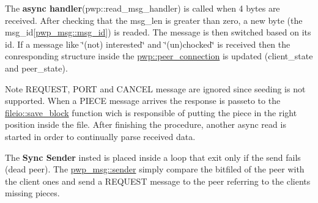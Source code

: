 The {\bfseries async handler}(pwp\+::read\+\_\+msg\+\_\+handler) is called when 4 bytes are received. After checking that the msg\+\_\+len is greater than zero, a new byte (the msg\+\_\+id\mbox{[}\hyperlink{namespacepwp__msg_a0b9a29508f00a30e5138d2b78f4b1daf}{pwp\+\_\+msg\+::msg\+\_\+id}\mbox{]}) is readed. The message is then switched based on its id. If a message like \char`\"{}(not) interested\char`\"{} and \char`\"{}(un)chocked\char`\"{} is received then the conresponding structure inside the \hyperlink{structpwp_1_1peer__connection}{pwp\+::peer\+\_\+connection} is updated (client\+\_\+state and peer\+\_\+state). \begin{DoxyNote}{Note}
R\+E\+Q\+U\+E\+ST, P\+O\+RT and C\+A\+N\+C\+EL message are ignored since seeding is not supported. When a P\+I\+E\+CE message arrives the response is passeto to the \hyperlink{namespacefileio_acc37418d350d6d36c3f691c99de9cf39}{fileio\+::save\+\_\+block} function wich is responsible of putting the piece in the right position inside the file. After finishing the procedure, another async read is started in order to continually parse received data.
\end{DoxyNote}
The {\bfseries Sync Sender} insted is placed inside a loop that exit only if the send fails (dead peer). The \hyperlink{namespacepwp__msg_ab578b213d293636d33efc24382f16b25}{pwp\+\_\+msg\+::sender} simply compare the bitfiled of the peer with the client ones and send a R\+E\+Q\+U\+E\+ST message to the peer referring to the client\textquotesingle{}s missing pieces. 